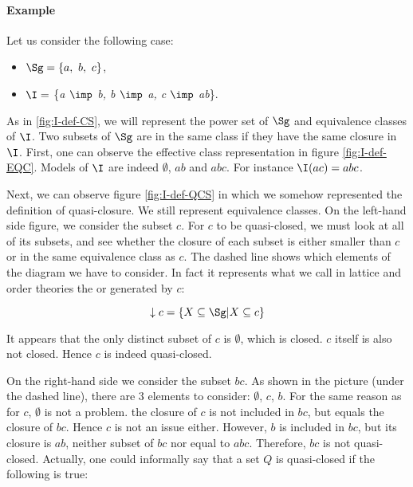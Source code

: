 \paragraph{Example} Let us consider the following case:
\begin{itemize}
	\item $\Sg = \{a, \ b, \ c \}$,
	\item $\I = $ \{\textit{a $\imp$ b, b $\imp$ a, c $\imp$ ab}\}.
\end{itemize}
As in \ref{fig:I-def-CS}, we will represent the power set of $\Sg$ and 
equivalence classes of $\I$. Two subsets of $\Sg$ are in the same class if they
have the same closure in $\I$. First, one can observe the effective class 
representation in figure \ref{fig:I-def-EQC}. Models of $\I$ are indeed 
$\emptyset$, $ab$ and $abc$. For instance $\I(ac) = abc$.

\vspace{1.2em}

\begin{figure}[ht]
	
\end{figure}

Next, we can observe figure \ref{fig:I-def-QCS} in which we somehow represented 
the definition of quasi-closure. We still represent equivalence classes. On
the left-hand side figure, we consider the subset $c$. For $c$ to be 
quasi-closed, we must look at all of its subsets, and see whether the closure
of each subset is either smaller than $c$ or in the same equivalence class
as $c$. The dashed line shows which elements of the diagram we have to 
consider. In fact it represents what we call in lattice and order theories the 
 or  generated by $c$:

	\[ \downarrow c = \{ X \subseteq \Sg | X \subseteq c \} \] 

It appears that the only distinct subset of $c$ is $\emptyset$, which is 
closed. $c$ itself is also not closed. Hence $c$ is indeed quasi-closed. 

\vspace{1.2em}

\begin{figure}[ht]
	
\end{figure}

On the right-hand side we consider the subset $bc$. As shown in the picture 
(under the dashed line), there are 3 elements to consider: $\emptyset$, $c$, 
$b$. For the same reason as for $c$, $\emptyset$ is not a problem. the closure
of $c$ is not included in $bc$, but equals the closure of $bc$. Hence $c$ is
not an issue either. However, $b$ is included in $bc$, but its closure is $ab$,
neither subset of $bc$ nor equal to $abc$. Therefore, $bc$ is not quasi-closed.
Actually, one could informally say that a set $Q$ is quasi-closed if the 
following is true:

